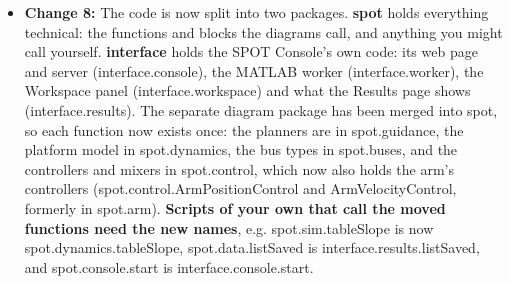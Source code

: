\documentclass[11pt]{article}
\begin{document}
\begin{itemize}[label={\textcolor{primaryColor}{\textbullet}}]
    \item \textbf{Change 8:} The code is now split into two packages. \textbf{spot} holds everything technical: the functions and blocks the diagrams call, and anything you might call yourself. \textbf{interface} holds the SPOT Console's own code: its web page and server (interface.console), the MATLAB worker (interface.worker), the Workspace panel (interface.workspace) and what the Results page shows (interface.results). The separate diagram package has been merged into spot, so each function now exists once: the planners are in spot.guidance, the platform model in spot.dynamics, the bus types in spot.buses, and the controllers and mixers in spot.control, which now also holds the arm's controllers (spot.control.ArmPositionControl and ArmVelocityControl, formerly in spot.arm). \textbf{Scripts of your own that call the moved functions need the new names}, e.g. spot.sim.tableSlope is now spot.dynamics.tableSlope, spot.data.listSaved is interface.results.listSaved, and spot.console.start is interface.console.start.
\end{itemize}

\end{document}

